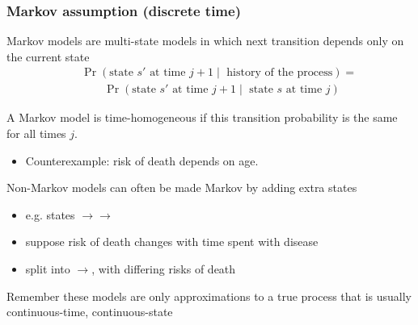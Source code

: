\begin{frame}

\frametitle{Markov assumption (discrete time)}

\alert{Markov} models are multi-state models in which next transition
depends only on the current state
\begin{eqnarray*}
&&\Pr(\mbox{state $s'$ at time $j+1 \mid$ history of the process}) = \\
&&\qquad \Pr(\mbox{state $s'$ at time $j+1\mid$ state $s$ at time $j$})
\end{eqnarray*}

\pause

A Markov model is \alert{time-homogeneous} if this transition probability is the same for all times $j$.  
\begin{itemize}
\item Counterexample: risk of death depends on age.
\end{itemize}

\pause

Non-Markov models can often be made Markov by adding extra states
\begin{itemize}
\item e.g. states $\rightarrow$$\rightarrow$ 
\item suppose risk of death changes with time spent with disease
\item split  into $\rightarrow$, with differing risks of death 
\end{itemize}

Remember these models are only approximations to a true process that is usually continuous-time, continuous-state

\end{frame}




